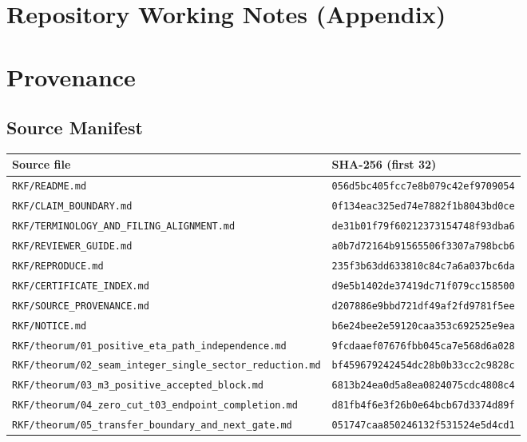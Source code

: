\documentclass[11pt,openany]{book}
\begin{document}
\part{Repository Working Notes (Appendix)}








\appendix\part{Provenance}
\chapter{Source Manifest}
\begin{small}\begin{longtable}{p{}p{}}
\textbf{Source file} & \textbf{SHA-256 (first 32)}\\\hline
\texttt{RKF/README.md} & \texttt{056d5bc405fcc7e8b079c42ef9709054}\\
\texttt{RKF/CLAIM\_BOUNDARY.md} & \texttt{0f134eac325ed74e7882f1b8043bd0ce}\\
\texttt{RKF/TERMINOLOGY\_AND\_FILING\_ALIGNMENT.md} & \texttt{de31b01f79f60212373154748f93dba6}\\
\texttt{RKF/REVIEWER\_GUIDE.md} & \texttt{a0b7d72164b91565506f3307a798bcb6}\\
\texttt{RKF/REPRODUCE.md} & \texttt{235f3b63dd633810c84c7a6a037bc6da}\\
\texttt{RKF/CERTIFICATE\_INDEX.md} & \texttt{d9e5b1402de37419dc71f079cc158500}\\
\texttt{RKF/SOURCE\_PROVENANCE.md} & \texttt{d207886e9bbd721df49af2fd9781f5ee}\\
\texttt{RKF/NOTICE.md} & \texttt{b6e24bee2e59120caa353c692525e9ea}\\
\texttt{RKF/theorum/01\_positive\_eta\_path\_independence.md} & \texttt{9fcdaaef07676fbb045ca7e568d6a028}\\
\texttt{RKF/theorum/02\_seam\_integer\_single\_sector\_reduction.md} & \texttt{bf459679242454dc28b0b33cc2c9828c}\\
\texttt{RKF/theorum/03\_m3\_positive\_accepted\_block.md} & \texttt{6813b24ea0d5a8ea0824075cdc4808c4}\\
\texttt{RKF/theorum/04\_zero\_cut\_t03\_endpoint\_completion.md} & \texttt{d81fb4f6e3f26b0e64bcb67d3374d89f}\\
\texttt{RKF/theorum/05\_transfer\_boundary\_and\_next\_gate.md} & \texttt{051747caa850246132f531524e5d4cd1}\\

\end{longtable}
\end{small}
\end{document}
